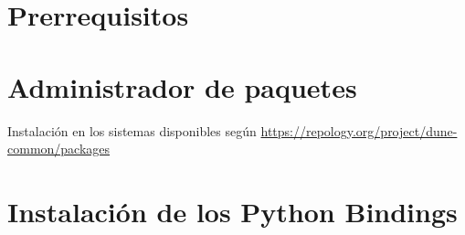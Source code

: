 \section{Prerrequisitos}

\section{Administrador de paquetes}

Instalación en los sistemas disponibles según \url{https://repology.org/project/dune-common/packages}

\section{Instalación de los Python Bindings}
